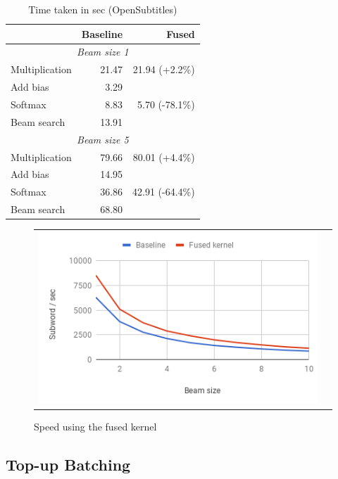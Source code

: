\documentclass[11pt,a4paper]{article}
\begin{document}
\begin{table}
\begin{center}
\small
\begin{tabular}{|l|r|r|} \hline
		& Baseline	& Fused \\ \hline
\multicolumn{3}{|c|}{\emph{Beam size 1}}	\\ \hline	
Multiplication 	& 21.47 	& 21.94 (+2.2\%) \\ \hline
Add bias 	& 3.29		&  \\ 
Softmax 	& 8.83		& 5.70 (-78.1\%)\\
Beam search	& 13.91		&  \\ \hline
\multicolumn{3}{|c|}{\emph{Beam size 5}}	\\ \hline	
Multiplication 	& 79.66 	& 80.01 (+4.4\%) \\ \hline
Add bias 	& 14.95		&  \\ 
Softmax 	& 36.86		& 42.91 (-64.4\%)\\
Beam search	& 68.80		&  \\ \hline
\end{tabular}
\end{center}
\caption{Time taken in sec (OpenSubtitles)}
\label{tab:fused-breakdown-opensubtitles}
\end{table}

\begin{figure}
\centering
\begin{tabular}{cc}
{\includegraphics[scale=0.5]{beam-opensubtitles.png}} 
\end{tabular}
\caption{Speed using the fused kernel}
\label{fig:beam-opensubtitles}
\end{figure} 

\subsection{Top-up Batching}
\end{document}
